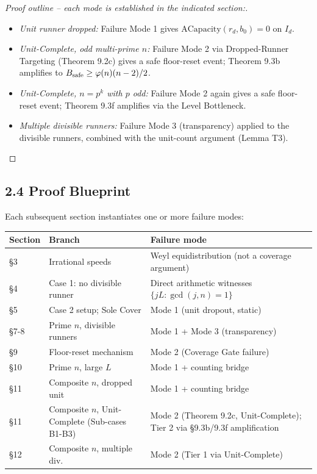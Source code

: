\documentclass[11pt,a4paper]{article}
\theoremstyle{plain}
\theoremstyle{definition}
\theoremstyle{remark}
\begin{document}
\begin{proof}[Proof outline -- each mode is established in the indicated section:]
\begin{itemize}
\item \textit{Unit runner dropped:} Failure Mode 1 gives $\mathrm{ACapacity}(r_d, b_0) = 0$ on $I_d$.
\item \textit{Unit-Complete, odd multi-prime $n$:} Failure Mode 2 via Dropped-Runner Targeting (Theorem 9.2c) gives a safe floor-reset event; Theorem 9.3b amplifies to $B_{\rm safe} \geq \varphi(n)(n-2)/2$.
\item \textit{Unit-Complete, $n = p^k$ with $p$ odd:} Failure Mode 2 again gives a safe floor-reset event; Theorem 9.3f amplifies via the Level Bottleneck.
\item \textit{Multiple divisible runners:} Failure Mode 3 (transparency) applied to the divisible runners, combined with the unit-count argument (Lemma T3).
\end{itemize}
\end{proof}


\subsection{2.4 Proof Blueprint}


Each subsequent section instantiates one or more failure modes:


\begin{center}\begin{tabular}{lll}
\toprule
Section & Branch & Failure mode \\
\midrule
§3 & Irrational speeds & Weyl equidistribution (not a coverage argument) \\
§4 & Case 1: no divisible runner & Direct arithmetic witnesses $\{jL : \gcd(j,n)=1\}$ \\
§5 & Case 2 setup; Sole Cover & Mode 1 (unit dropout, static) \\
§7-8 & Prime $n$, divisible runners & Mode 1 + Mode 3 (transparency) \\
§9 & Floor-reset mechanism & Mode 2 (Coverage Gate failure) \\
§10 & Prime $n$, large $L$ & Mode 1 + counting bridge \\
§11 & Composite $n$, dropped unit & Mode 1 + counting bridge \\
§11 & Composite $n$, Unit-Complete (Sub-cases B1-B3) & Mode 2 (Theorem 9.2c, Unit-Complete); Tier 2 via §9.3b/9.3f amplification \\
§12 & Composite $n$, multiple div. & Mode 2 (Tier 1 via Unit-Complete) \\
\bottomrule
\end{tabular}\end{center}
\end{document}
